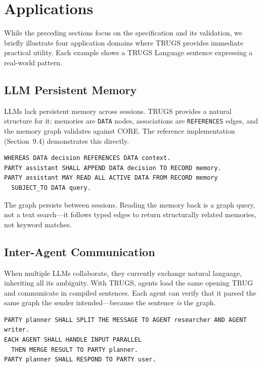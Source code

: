 \documentclass{article}
\begin{document}
\section{Applications}

While the preceding sections focus on the specification and its validation, we briefly illustrate four application domains where TRUGS provides immediate practical utility. Each example shows a TRUGS Language sentence expressing a real-world pattern.

\subsection{LLM Persistent Memory}

LLMs lack persistent memory across sessions. TRUGS provides a natural structure for it: memories are \texttt{DATA} nodes, associations are \texttt{REFERENCES} edges, and the memory graph validates against CORE. The reference implementation (Section~9.4) demonstrates this directly.

\begin{lstlisting}[style=trugs]
WHEREAS DATA decision REFERENCES DATA context.
PARTY assistant SHALL APPEND DATA decision TO RECORD memory.
PARTY assistant MAY READ ALL ACTIVE DATA FROM RECORD memory
  SUBJECT_TO DATA query.
\end{lstlisting}

The graph persists between sessions. Reading the memory back is a graph query, not a text search---it follows typed edges to return structurally related memories, not keyword matches.

\subsection{Inter-Agent Communication}

When multiple LLMs collaborate, they currently exchange natural language, inheriting all its ambiguity. With TRUGS, agents load the same opening TRUG and communicate in compiled sentences. Each agent can verify that it parsed the same graph the sender intended---because the sentence \textit{is} the graph.

\begin{lstlisting}[style=trugs]
PARTY planner SHALL SPLIT THE MESSAGE TO AGENT researcher AND AGENT writer.
EACH AGENT SHALL HANDLE INPUT PARALLEL
  THEN MERGE RESULT TO PARTY planner.
PARTY planner SHALL RESPOND TO PARTY user.
\end{lstlisting}
\end{document}
